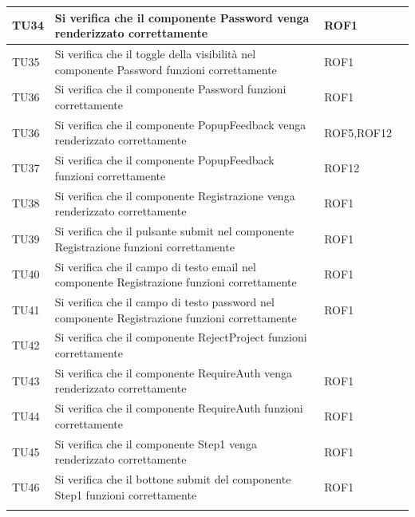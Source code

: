 \documentclass{article}
\begin{document}
    \begin{center}
    \begin{tabular}{P{5em} P{21em} P{6em} P{6em}}
     TU34 & Si verifica che il componente Password venga renderizzato correttamente   & ROF1 & \\
    \hline
    TU35& Si verifica che il toggle della visibilità nel componente Password funzioni correttamente& ROF1 & \\
    \hline{}
     TU36 & Si verifica che il componente Password funzioni correttamente   & ROF1 & \\
    \hline
    TU36&Si verifica che il componente PopupFeedback venga renderizzato correttamente & ROF5,ROF12 & \\
    \hline{}
     TU37 & Si verifica che il componente PopupFeedback funzioni correttamente  &  ROF12 & \\
    \hline
    TU38&Si verifica che il componente Registrazione venga renderizzato correttamente & ROF1 & \\
    \hline{}
     TU39 & Si verifica che il pulsante submit nel componente Registrazione funzioni correttamente   & ROF1 & \\
    \hline
    TU40&  Si verifica che il campo di testo email nel componente Registrazione funzioni correttamente& ROF1& \\
    \hline{}
     TU41 & Si verifica che il campo di testo password nel componente Registrazione funzioni correttamente  & ROF1 & \\
    \hline
    TU42& Si verifica che il componente RejectProject funzioni correttamente&  & \\
    \hline{}
     TU43 & Si verifica che il componente RequireAuth venga renderizzato correttamente  &ROF1  & \\
    \hline
    TU44& Si verifica che il componente RequireAuth funzioni correttamente & ROF1 & \\
    \hline{}
     TU45 & Si verifica che il componente Step1 venga renderizzato correttamente  & ROF1 & \\
    \hline
    TU46& Si verifica che il bottone submit del componente Step1 funzioni correttamente & ROF1 & \\
    \hline{}

\end{tabular}
\end{center}
\end{document}
